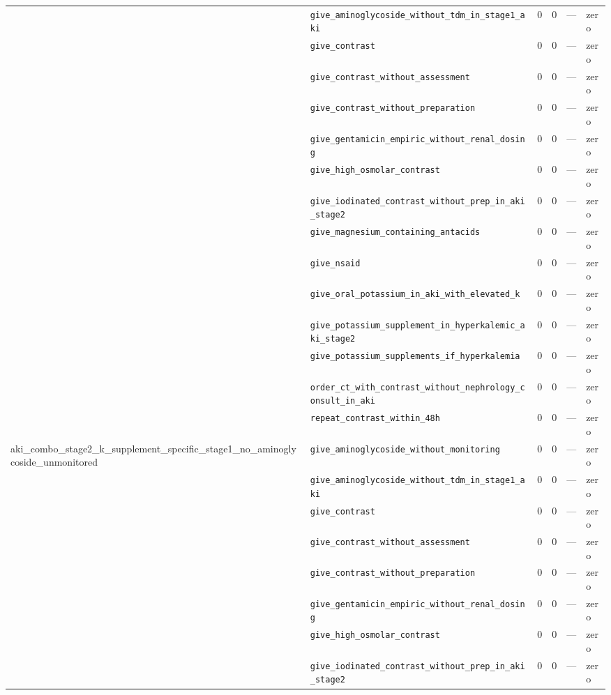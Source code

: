 \begin{table}[ht]
\begin{tabular}{llrrrl}
 & \texttt{give\_aminoglycoside\_without\_tdm\_in\_stage1\_aki} & 0 & 0 & — & zero \\
 & \texttt{give\_contrast} & 0 & 0 & — & zero \\
 & \texttt{give\_contrast\_without\_assessment} & 0 & 0 & — & zero \\
 & \texttt{give\_contrast\_without\_preparation} & 0 & 0 & — & zero \\
 & \texttt{give\_gentamicin\_empiric\_without\_renal\_dosing} & 0 & 0 & — & zero \\
 & \texttt{give\_high\_osmolar\_contrast} & 0 & 0 & — & zero \\
 & \texttt{give\_iodinated\_contrast\_without\_prep\_in\_aki\_stage2} & 0 & 0 & — & zero \\
 & \texttt{give\_magnesium\_containing\_antacids} & 0 & 0 & — & zero \\
 & \texttt{give\_nsaid} & 0 & 0 & — & zero \\
 & \texttt{give\_oral\_potassium\_in\_aki\_with\_elevated\_k} & 0 & 0 & — & zero \\
 & \texttt{give\_potassium\_supplement\_in\_hyperkalemic\_aki\_stage2} & 0 & 0 & — & zero \\
 & \texttt{give\_potassium\_supplements\_if\_hyperkalemia} & 0 & 0 & — & zero \\
 & \texttt{order\_ct\_with\_contrast\_without\_nephrology\_consult\_in\_aki} & 0 & 0 & — & zero \\
 & \texttt{repeat\_contrast\_within\_48h} & 0 & 0 & — & zero \\
\midrule
aki\_combo\_stage2\_k\_supplement\_specific\_stage1\_no\_aminoglycoside\_unmonitored & \texttt{give\_aminoglycoside\_without\_monitoring} & 0 & 0 & — & zero \\
 & \texttt{give\_aminoglycoside\_without\_tdm\_in\_stage1\_aki} & 0 & 0 & — & zero \\
 & \texttt{give\_contrast} & 0 & 0 & — & zero \\
 & \texttt{give\_contrast\_without\_assessment} & 0 & 0 & — & zero \\
 & \texttt{give\_contrast\_without\_preparation} & 0 & 0 & — & zero \\
 & \texttt{give\_gentamicin\_empiric\_without\_renal\_dosing} & 0 & 0 & — & zero \\
 & \texttt{give\_high\_osmolar\_contrast} & 0 & 0 & — & zero \\
 & \texttt{give\_iodinated\_contrast\_without\_prep\_in\_aki\_stage2} & 0 & 0 & — & zero \\

\end{tabular}
\end{table}
